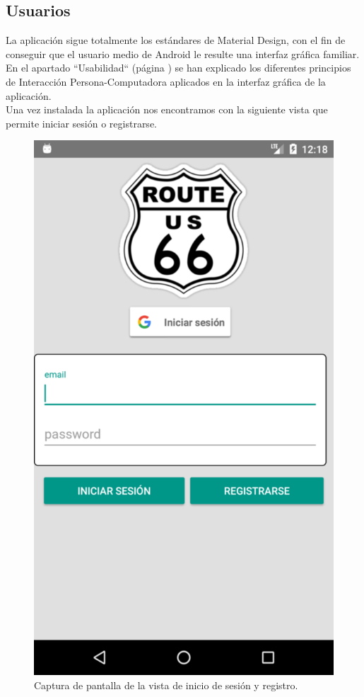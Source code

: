 \documentclass[twoside]{report}
\begin{document}
\subsection{Usuarios}
La aplicación sigue totalmente los estándares de Material Design, con el fin de conseguir que el usuario medio de Android le resulte una interfaz gráfica familiar. En el apartado “Usabilidad“ (página \pageref{usabilitymatters}) se han explicado los diferentes principios de Interacción Persona-Computadora aplicados en la interfaz gráfica de la aplicación.\\

Una vez instalada la aplicación nos encontramos con la siguiente vista que permite iniciar sesión o registrarse.

\begin{figure}[H]
\begin{center}
\includegraphics[scale=0.3]{images/userguide/0.png}
\caption{Captura de pantalla de la vista de inicio de sesión y registro.}
\end{center}
\end{figure}
\end{document}

